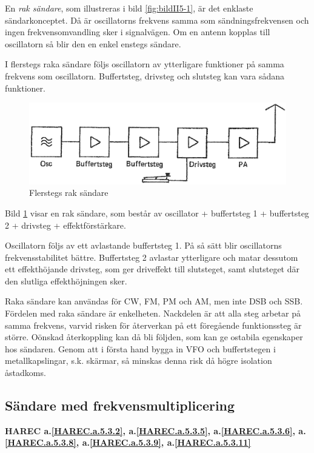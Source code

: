 En \emph{rak sändare}, som illustreras i bild \ref{fig:bildII5-1}, är det
enklaste sändarkonceptet.
Då är oscillatorns frekvens samma som sändningsfrekvensen och ingen
frekvensomvandling sker i signalvägen.
Om en antenn kopplas till oscillatorn så blir den en enkel enstegs sändare.

I flerstegs raka sändare följs oscillatorn av ytterligare funktioner
på samma frekvens som oscillatorn.
Buffertsteg, drivsteg och slutsteg kan vara sådana funktioner.

\begin{figure}
  \includegraphics[width=\textwidth]{images/cropped_pdfs/bild_2_5-02.pdf}
  \caption{Flerstegs rak sändare}
  \label{fig:bildII5-2}
\end{figure}

Bild \ref{fig:bildII5-2} visar en rak sändare, som består av oscillator +
buffertsteg 1 + buffertsteg 2 + drivsteg + effektförstärkare.

Oscillatorn följs av ett avlastande buffertsteg 1.
På så sätt blir oscillatorns frekvensstabilitet bättre.
Buffertsteg 2 avlastar ytterligare och matar dessutom ett effekthöjande
drivsteg, som ger driveffekt till slutsteget, samt slutsteget där den slutliga
effekthöjningen sker.

Raka sändare kan användas för CW, FM, PM och AM, men inte DSB och SSB.
Fördelen med raka sändare är enkelheten.
Nackdelen är att alla steg arbetar på samma frekvens, varvid risken för
återverkan på ett föregående funktionssteg är större.
Oönskad återkoppling kan då bli följden, som kan ge ostabila egenskaper hos
sändaren.
Genom att i första hand bygga in VFO och buffertstegen i metallkapslingar,
s.k. skärmar, så minskas denna risk då högre isolation åstadkoms.

\subsection{Sändare med frekvensmultiplicering}
\textbf{HAREC
 a.\ref{HAREC.a.5.3.2}\label{myHAREC.a.5.3.2},
 a.\ref{HAREC.a.5.3.5}\label{myHAREC.a.5.3.5},
 a.\ref{HAREC.a.5.3.6}\label{myHAREC.a.5.3.6},
 a.\ref{HAREC.a.5.3.8}\label{myHAREC.a.5.3.8},
 a.\ref{HAREC.a.5.3.9}\label{myHAREC.a.5.3.9},
 a.\ref{HAREC.a.5.3.11}\label{myHAREC.a.5.3.11}
}

